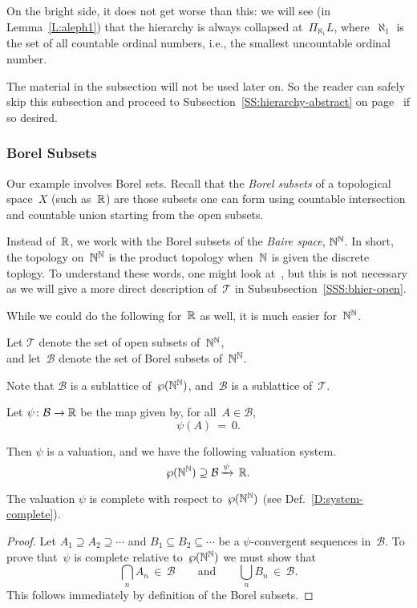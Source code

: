 On the bright side,
it does not get worse than this:
we will see 
(in Lemma~\ref{L:aleph1})
that 
the hierarchy is always collapsed at~$\Pi_{\aleph_1} L$,
where~$\aleph_1$
is the set of all countable ordinal numbers,
i.e., the smallest uncountable ordinal number.

The material in the subsection will not be used later on.
So the reader can safely skip this subsection
and proceed to Subsection~\ref{SS:hierarchy-abstract} 
on page~\pageref{SS:hierarchy-abstract}
if so desired.

\subsubsection{Borel Subsets}$\,$\\
Our example involves Borel sets.
Recall that the \emph{Borel subsets}
of a topological space~$X$
(such as~$\mathbb{R}$)
are those subsets one can form using countable intersection
and countable union starting from the open subsets.

Instead of~$\mathbb{R}$,
we  work with the Borel subsets
of the 
 \emph{Baire space},
 $\mathbb{N}^{\mathbb{N}}$.
In short,
the topology on~$\mathbb{N}^{\mathbb{N}}$
is the product topology
when~$\mathbb{N}$ is given the discrete toplogy.
To understand these words,
one might look at~\cite{Willard70},
but this is not necessary as we will
give a more direct description of~$\mathcal{T}$
in Subsubsection~\ref{SSS:bhier-open}.

While we could do the following
for~$\mathbb{R}$ as well,
it is much easier for~$\mathbb{N}^{\mathbb{N}}$.
\begin{nt}
Let $\mathcal{T}$
denote the set of open subsets of~$\mathbb{N}^{\mathbb{N}}$, \\
and let~$\mathcal{B}$
denote the set of Borel subsets of~$\mathbb{N}^{\mathbb{N}}$.
\end{nt}
Note that $\mathcal{B}$
is a sublattice of~$\wp(\mathbb{N}^{\mathbb{N}})$,
and~$\mathcal{B}$ is a sublattice of~$\mathcal{T}$.

\begin{dfn}
Let $\psi\colon \mathcal{B}\rightarrow \mathbb{R}$
be the map given by, for all~$A\in \mathcal{B}$,
\begin{equation*}
\psi(A)\ =\ 0.
\end{equation*}
\end{dfn}
Then $\psi$ is a valuation,
and we have the following valuation system.
\begin{equation*}
\wp(\mathbb{N}^{\mathbb{N}}) \supseteq \mathcal{B}\,\smash{\xrightarrow{\psi}\,\mathbb{R}}.
\end{equation*}

\begin{lem}
The valuation $\psi$ is complete with respect to~$\wp(\mathbb{N}^{\mathbb{N}})$
(see Def.~\ref{D:system-complete}).
\end{lem}
\begin{proof}
Let $A_1 \supseteq A_2 \supseteq \dotsb$
and $B_1 \subseteq B_2 \subseteq \dotsb$
be a $\psi$-convergent sequences in~$\mathcal{B}$.
To prove that~$\psi$ is complete relative to~$\wp(\mathbb{N}^{\mathbb{N}})$
we must show that 
\begin{equation*}
\textstyle 
\bigcap_n A_n \,\in\, \mathcal{B}
\qquad\text{and}\qquad
\bigcup_n B_n \,\in\, \mathcal{B}.
\end{equation*}
This follows immediately by definition of
the Borel subsets.
\end{proof}

